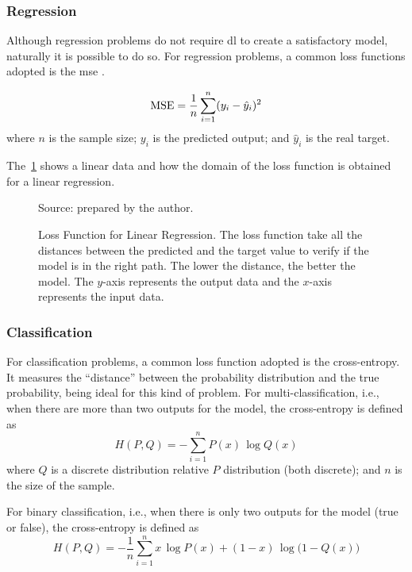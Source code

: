 \subsubsection*{Regression}

Although regression problems do not require \gls*{dl} to create a satisfactory model, naturally it is possible to do so.
For regression problems, a common loss functions adopted is the \gls*{mse} \citep{bussab2017}. 

\begin{equation}
    \text{MSE} = \frac{1}{n} \sum_{i=1}^n (y_i - \hat{y}_i)^2
    \label{eq:mse}
\end{equation}
%
where \(n\) is the sample size; \(y_i\) is the predicted output; and \(\hat{y}_i\) is the real target.

The~\cref{fig:mae_chart} shows a linear data and how the domain of the loss function is obtained for a linear regression.
%
\begin{figure}[!htb]
    \centering
    \caption[Loss Function for Linear Regression]{Loss Function for Linear Regression. The loss function take all the distances between the predicted and the target value to verify if the model is in the right path. The lower the distance, the better the model. The \(y\)-axis represents the output data and the \(x\)-axis represents the input data.}
    
    
    {\footnotesize Source: prepared by the author.}
    \label{fig:mae_chart}
\end{figure}

\subsubsection*{Classification}

For classification problems, a common loss function adopted is the cross-entropy.
It measures the ``distance'' between the probability distribution and the true probability, being ideal for this kind of problem.
For multi-classification, i.e., when there are more than two outputs for the model, the cross-entropy is defined as
%
\begin{equation}
    H(P,Q) = - \sum_{i=1}^n P(x) \, \log Q(x)
    \label{eq:cross_entropy}
\end{equation}
%
where \(Q\) is a discrete distribution relative \(P\) distribution (both discrete); and \(n\) is the size of the sample.

For binary classification, i.e., when there is only two outputs for the model (true or false), the cross-entropy is defined as
%
\begin{equation}
    H(P,Q) = - \frac{1}{n} \sum_{i=1}^n x \, \log P(x) + (1-x) \, \log \Big(1-Q(x)\Big)
    \label{eq:binary_cross_entropy}
\end{equation}

